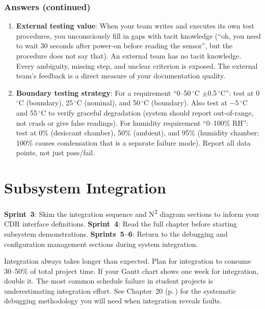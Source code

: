 \documentclass[11pt,letterpaper,twoside,openany]{book}
\newcommand{\degC}{\ensuremath{{}^{\circ}\text{C}}}
\begin{document}
\subsection{Answers (continued)}
\begin{enumerate}[leftmargin=1.5em, start=6]
\item \textbf{External testing value}: When your team writes and executes its own test procedures, you unconsciously fill in gaps with tacit knowledge (``oh, you need to wait 30 seconds after power-on before reading the sensor'', but the procedure does not say that). An external team has no tacit knowledge. Every ambiguity, missing step, and unclear criterion is exposed. The external team's feedback is a direct measure of your documentation quality.

\item \textbf{Boundary testing strategy}: For a requirement ``0--50\,\degC{} $\pm$0.5\,\degC{}'': test at 0\,\degC{} (boundary), 25\,\degC{} (nominal), and 50\,\degC{} (boundary). Also test at $-5$\,\degC{} and 55\,\degC{} to verify graceful degradation (system should report out-of-range, not crash or give false readings). For humidity requirement ``0--100\% RH'': test at 0\% (desiccant chamber), 50\% (ambient), and 95\% (humidity chamber; 100\% causes condensation that is a separate failure mode). Report all data points, not just pass/fail.
\end{enumerate}

\chapter{Subsystem Integration}\label{ch:integration}

\begin{tipbox}
\textbf{Sprint~3}: Skim the integration sequence and N\textsuperscript{2} diagram sections to inform your CDR interface definitions. \textbf{Sprint~4}: Read the full chapter before starting subsystem demonstrations. \textbf{Sprints~5--6}: Return to the debugging and configuration management sections during system integration.
\end{tipbox}

\begin{warningbox}
Integration always takes longer than expected. Plan for integration to consume 30--50\% of total project time. If your Gantt chart shows one week for integration, double it. The most common schedule failure in student projects is underestimating integration effort. See Chapter~20 (p.\,\pageref{ch:debug}) for the systematic debugging methodology you will need when integration reveals faults.
\end{warningbox}
\end{document}
